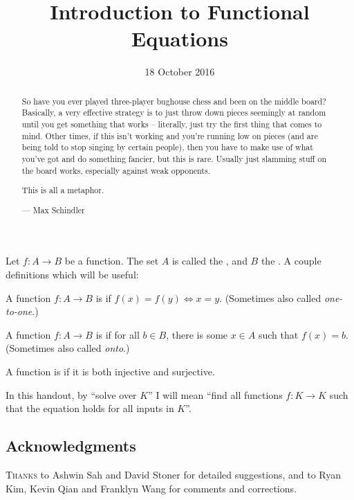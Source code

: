 \documentclass[11pt]{scrartcl}
\begin{document}
\title{Introduction to Functional Equations} %
\date{18 October 2016}
\maketitle

\begin{abstract}
  \sffamily\small
  So have you ever played three-player bughouse chess and been on the middle board?
  Basically, a very effective strategy is to just throw down pieces seemingly at random
  until you get something that works -- literally, just try the first thing that comes
  to mind. Other times, if this isn't working and you're running low on pieces
  {\scriptsize (and are being told to stop singing by certain people)}, then you have to
  make use of what you've got and do something fancier, but this is rare. Usually just
  slamming stuff on the board works, especially against weak opponents.

  This is all a metaphor.

  \medskip

  --- Max Schindler
\end{abstract}

\vspace{1em}

Let $f\colon A \to B$ be a function.
The set $A$ is called the , and $B$ the .
A couple definitions which will be useful:
\begin{definition}
  A function $f\colon A \to B$ is  if $f(x) = f(y) \iff x=y$.
  (Sometimes also called \emph{one-to-one}.)
\end{definition}
\begin{definition}
  A function $f\colon A \to B$ is  if for all $b \in B$,
  there is some $x \in A$ such that $f(x) = b$.
  (Sometimes also called \emph{onto}.)
\end{definition}
\begin{definition}
  A function is  if it is both injective and surjective.
\end{definition}

In this handout, by ``solve over $K$''
I will mean ``find all functions $f \colon K \to K$ such
that the equation holds for all inputs in $K$''.

\subsection*{Acknowledgments}
\textsc{Thanks} to Ashwin Sah and David Stoner for detailed suggestions,
and to Ryan Kim, Kevin Qian and Franklyn Wang for comments and corrections.
\end{document}
